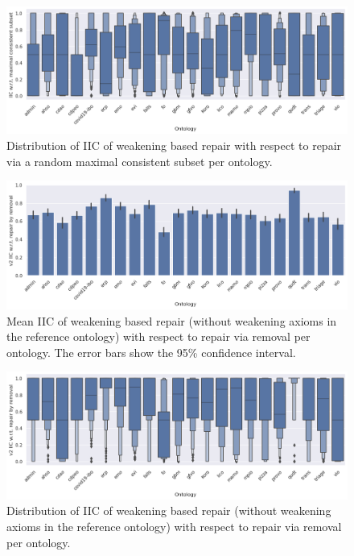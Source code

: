 \begin{figure}[ht]
    \centering
    \includegraphics[width=\textwidth]{resources/iic-mcs-ontology-violin.png}
    \caption{Distribution of IIC of weakening based repair with respect to repair via a random maximal consistent subset per ontology.}
\end{figure}

\begin{figure}[ht]
  \centering
  \includegraphics[width=\textwidth]{resources/iic-enhance-rem-ontology-bar.png}
  \caption{Mean IIC of weakening based repair (without weakening axioms in the reference ontology) with respect to repair via removal per ontology. The error bars show the 95\% confidence interval.}
\end{figure}

\begin{figure}[ht]
  \centering
  \includegraphics[width=\textwidth]{resources/iic-enhance-rem-ontology-violin.png}
  \caption{Distribution of IIC of weakening based repair (without weakening axioms in the reference ontology) with respect to repair via removal per ontology.}
\end{figure}

